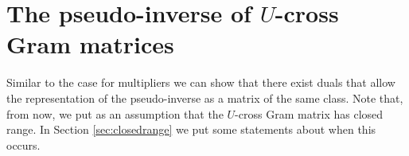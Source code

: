 \documentclass{birkjour}
\theoremstyle{definition}
\theoremstyle{remark}
\numberwithin{equation}{section}
\begin{document}
\section{The pseudo-inverse of $U$-cross Gram matrices} \label{sec:pivv} 


Similar to the case for multipliers \cite{balsto09new} we can show
that there exist duals that allow the representation of the pseudo-inverse as a matrix of the same class.
Note that, from now, we put as an assumption that the $U$-cross Gram matrix has closed range. In Section \ref{sec:closedrange} we put some statements about when this occurs.

\newcommand{\sd}[2]{#1^{\left(U,#2\right)}}
\newcommand{\ds}[2]{#1^{\overline{\left( U,#2\right)}}}
\newcommand{\sda}[2]{#1^{\left(U^*,#2\right)}}
\newcommand{\dsa}[2]{#1^{\overline{\left( U^*,#2\right)}}}

\def\Phisd{\sd{\Phi}{\Psi}}
\def\phisd{\sd{\phi}{\psi}}

\def\Psipd{\ds{\Psi}{\Phi}}
\def\psipd{\ds{\psi}{\phi}}
\end{document}
